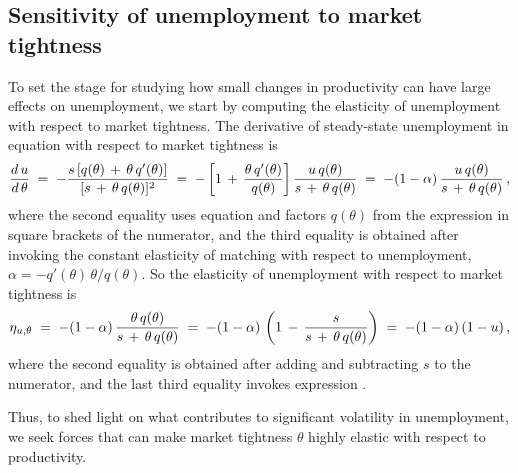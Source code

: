 \subsection{Sensitivity of unemployment to market tightness}

To set the stage for studying how small changes in productivity
can have large effects on unemployment, we start by computing
the elasticity of unemployment with respect to market tightness.
The derivative of steady-state unemployment in equation
 with respect to market tightness is
$$
{{d}\, u \over {d} \, \theta } \;=\;
- { s \left[q(\theta) \,+\, \theta \,q'(\theta) \right] \over
  [s \,+\, \theta \,q(\theta)]^2 }
\;=\; -
\left[ 1 \,+\, { \theta \,q'(\theta) \over q(\theta)}  \right]
{ u\, q(\theta) \over   s \,+\, \theta \,q(\theta) }
\;=\;  - (1-\alpha)\,
{ u \,q(\theta) \over  s \,+\, \theta \,q(\theta) }
             \,,
$$
where the second equality uses equation  and factors
$q(\theta)$ from the expression in square brackets of the numerator,
and the third equality is obtained after invoking
the constant elasticity of matching with respect to unemployment,
$\alpha=-q'(\theta)\, \theta / q(\theta)$.
So the elasticity of
unemployment with respect to market tightness is
$$
\eta_{u,\theta}
\;=\; -(1-\alpha)\,
{ \theta \,q(\theta) \over  s \,+\, \theta \,q(\theta) }
\;=\; -(1-\alpha)\,
\left(1\,-\, { s \over  s \,+\, \theta \,q(\theta) } \right)
\;=\;  - (1-\alpha)\,(1-u)\,,                  %
$$
where the second equality is obtained after adding and subtracting
$s$ to the numerator, and the last third equality invokes
expression .


Thus, to shed light on what contributes to significant volatility
in unemployment, we seek forces that can make market tightness
$\theta$ highly elastic with respect to productivity.


